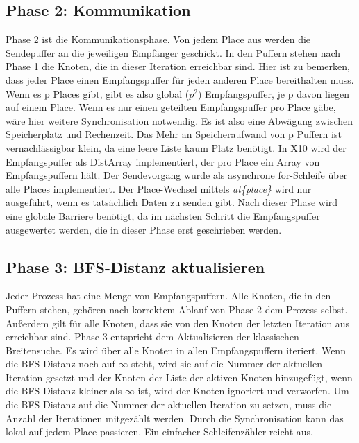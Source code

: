 \subsection{Phase 2: Kommunikation} %
\label{sub:parallel_phase_2}
Phase 2 ist die Kommunikationsphase. Von jedem Place aus werden die Sendepuffer an die jeweiligen Empfänger geschickt. In den Puffern stehen nach Phase 1 die Knoten, die in dieser Iteration erreichbar sind. Hier ist zu bemerken, dass jeder Place einen Empfangspuffer für jeden anderen Place bereithalten muss. Wenn es p Places gibt, gibt es also global ($p^2$) Empfangspuffer, je p davon liegen auf einem Place. Wenn es nur einen geteilten Empfangspuffer pro Place gäbe, wäre hier weitere Synchronisation notwendig. Es ist also eine Abwägung zwischen Speicherplatz und Rechenzeit. Das Mehr an Speicheraufwand von p Puffern ist vernachlässigbar klein, da eine leere Liste kaum Platz benötigt. In X10 wird der Empfangspuffer als DistArray implementiert, der pro Place ein Array von Empfangspuffern hält. Der Sendevorgang wurde als asynchrone for-Schleife über alle Places implementiert. Der Place-Wechsel mittels \textit{at\{place\}} wird nur ausgeführt, wenn es tatsächlich Daten zu senden gibt. Nach dieser Phase wird eine globale Barriere benötigt, da im nächsten Schritt die Empfangspuffer ausgewertet werden, die in dieser Phase erst geschrieben werden.

\subsection{Phase 3: BFS-Distanz aktualisieren} %
\label{sub:phase_3}
Jeder Prozess hat eine Menge von Empfangspuffern. Alle Knoten, die in den Puffern stehen, gehören nach korrektem Ablauf von Phase 2 dem Prozess selbst. Außerdem gilt für alle Knoten, dass sie von den Knoten der letzten Iteration aus erreichbar sind. Phase 3 entspricht dem Aktualisieren der klassischen Breitensuche. Es wird über alle Knoten in allen Empfangspuffern iteriert. Wenn die BFS-Distanz noch auf $\infty$ steht, wird sie auf die Nummer der aktuellen Iteration gesetzt und der Knoten der Liste der aktiven Knoten hinzugefügt, wenn die BFS-Distanz kleiner als $\infty$ ist, wird der Knoten ignoriert und verworfen. 
Um die BFS-Distanz auf die Nummer der aktuellen Iteration zu setzen, muss die Anzahl der Iterationen mitgezählt werden. Durch die Synchronisation kann das lokal auf jedem Place passieren. Ein einfacher Schleifenzähler reicht aus.


